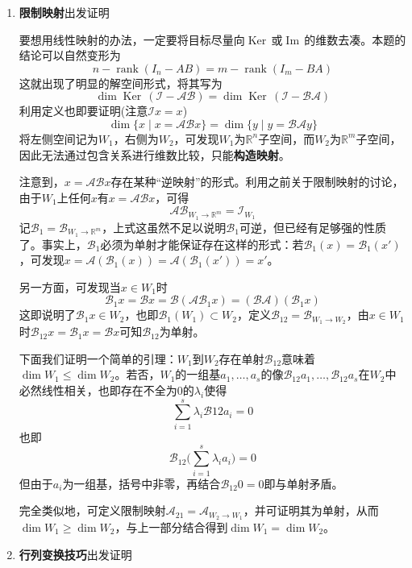 \documentclass[a4paper,UTF8,fontset=windows]{ctexart}
\DeclareMathOperator{\rank}{rank}
\DeclareMathOperator{\im}{Im\,}
\DeclareMathOperator{\Ker}{Ker\,}
\newcommand*{\ma}{\mathcal{A}}
\newcommand*{\mb}{\mathcal{B}}
\newcommand*{\mi}{\mathcal{I}}
\begin{document}
\begin{enumerate}
    \item \textbf{限制映射}出发证明
    
    要想用线性映射的办法，一定要将目标尽量向$\Ker$或$\im$的维数去凑。本题的结论可以自然变形为
    $$n-\rank(I_n-AB)=m-\rank(I_m-BA)$$
    这就出现了明显的解空间形式，将其写为
    $$\dim\Ker(\mi-\ma\mb)=\dim\Ker(\mi-\mb\ma)$$
    利用定义也即要证明(注意$\mi x=x$)
    $$\dim\{x\mid x=\ma\mb x\}=\dim\{y\mid y=\mb\ma y\}$$
    将左侧空间记为$W_1$，右侧为$W_2$，可发现$W_1$为$\mathbb{R}^n$子空间，而$W_2$为$\mathbb{R}^m$子空间，因此无法通过包含关系进行维数比较，只能\textbf{构造映射}。

    注意到，$x=\ma\mb x$存在某种``逆映射''的形式。利用之前关于限制映射的讨论，由于$W_1$上任何$x$有$x=\ma\mb x$，可得
    $$\ma\mb_{W_1\to\mathbb{R}^m}=\mi_{W_1}$$
    记$\mb_1=\mb_{W_1\to\mathbb{R}^m}$，上式这虽然不足以说明$\mb_1$可逆，但已经有足够强的性质了。事实上，$\mb_1$必须为单射才能保证存在这样的形式：若$\mb_1(x)=\mb_1(x')$，可发现$x=\ma(\mb_1(x))=\ma(\mb_1(x'))=x'$。

    另一方面，可发现当$x\in W_1$时
    $$\mb_1x=\mb x=\mb(\ma\mb_1x)=(\mb\ma)(\mb_1x)$$
    这即说明了$\mb_1x\in W_2$，也即$\mb_1(W_1)\subset W_2$，定义$\mb_{12}=\mb_{W_1\to W_2}$，由$x\in W_1$时$\mb_{12}x=\mb_1x=\mb x$可知$\mb_{12}$为单射。

    下面我们证明一个简单的引理：$W_1$到$W_2$存在单射$\mb_{12}$意味着$\dim W_1\le\dim W_2$。若否，$W_1$的一组基$a_1,\dots,a_s$的像$\mb_{12}a_1,\dots,\mb_{12}a_s$在$W_2$中必然线性相关，也即存在不全为0的$\lambda_i$使得
    $$\sum_{i=1}^s\lambda_i\mb{12}a_i=0$$
    也即
    $$\mb_{12}\bigg(\sum_{i=1}^s\lambda_ia_i\bigg)=0$$
    但由于$a_i$为一组基，括号中非零，再结合$\mb_{12}0=0$即与单射矛盾。

    完全类似地，可定义限制映射$\ma_{21}=\ma_{W_2\to W_1}$，并可证明其为单射，从而$\dim W_1\ge\dim W_2$，与上一部分结合得到$\dim W_1=\dim W_2$。

    \item \textbf{行列变换技巧}出发证明
    

\end{enumerate}
\end{document}
